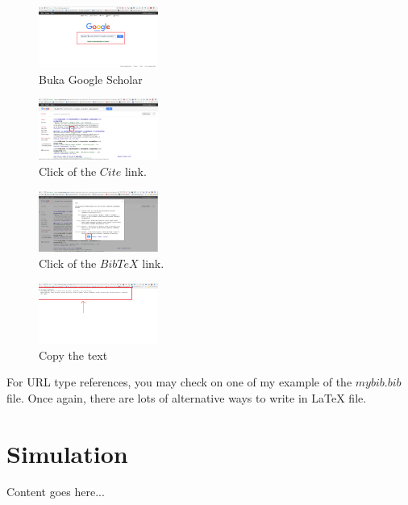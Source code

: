 \documentclass[journal]{IEEEtran}
\begin{document}
\begin{figure}[H]
\centering
  \includegraphics[width=0.35\textwidth]{get_bib_script_part_1}
\caption{Buka Google Scholar}
\label{fig:fig3_1}
\end{figure}

\begin{figure}[H]
\centering
  \includegraphics[width=0.35\textwidth]{get_bib_script_part_2}
\caption{Click of the $Cite$ link.}
\label{fig:fig3_2}
\end{figure}

\begin{figure}[H]
\centering
  \includegraphics[width=0.35\textwidth]{get_bib_script_part_3}
\caption{Click of the $BibTeX$ link.}
\label{fig:fig3_3}
\end{figure}

\begin{figure}[H]
\centering
  \includegraphics[width=0.35\textwidth]{get_bib_script_part_4}
\caption{Copy the text}
\label{fig:fig3_4}
\end{figure}

For URL type references, you may check on one of my example of the $mybib.bib$ file. Once again, there are lots of alternative ways to write in LaTeX file. 

\section{Simulation}
Content goes here... 
\end{document}
